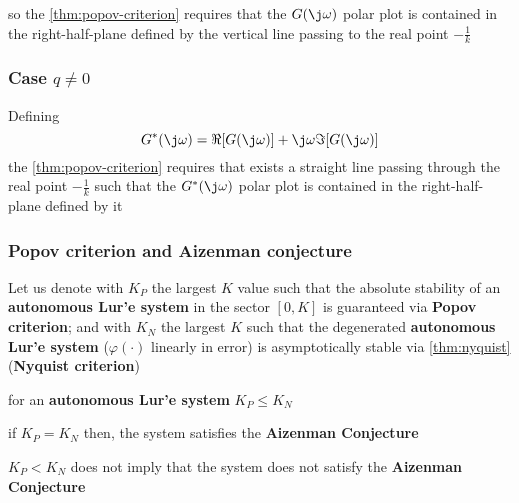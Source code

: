 so the \cref{thm:popov-criterion} requires that the $G(\j\omega)$ polar plot is contained in the right-half-plane defined by the vertical line passing to the real point $-\frac{1}{k}$

\subsubsection{Case $q \neq 0$}

\begin{corollary}
    Defining
    \[
        G^*(\j\omega) = \Re[G(\j\omega)] + \j\omega \Im[G(\j\omega)]
    \]
    the \cref{thm:popov-criterion} requires that exists a straight line passing through the real point $-\frac{1}{k}$ such that the $G^*(\j\omega)$ polar plot is contained in the right-half-plane defined by it
\end{corollary}

\subsubsection{Popov criterion and Aizenman conjecture}

Let us denote with $K_P$ the largest $K$ value such that the absolute stability of an \textbf{autonomous Lur'e system} in the sector $[0,K]$ is guaranteed via \textbf{Popov criterion};
and with $K_N$ the largest $K$ such that the degenerated \textbf{autonomous Lur'e system} ($\varphi(\cdot)$ linearly in error) is asymptotically stable via \cref{thm:nyquist}(\textbf{Nyquist criterion})

\begin{nb} for an \textbf{autonomous Lur'e system} $K_P \leq K_N$\end{nb}

\begin{nb}if $K_P = K_N$ then, the system satisfies the \textbf{Aizenman Conjecture} \end{nb}

\begin{nb}$K_P < K_N$ does not imply that the system does not satisfy the \textbf{Aizenman Conjecture}\end{nb}